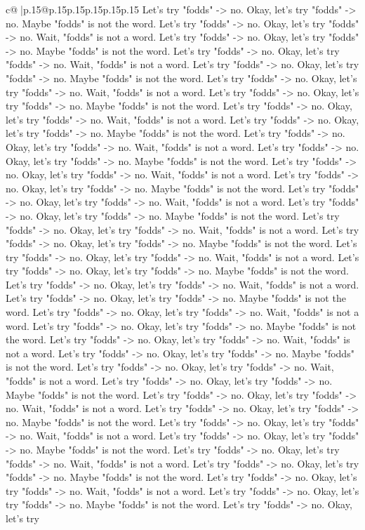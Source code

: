 \documentclass{article}
\begin{document}
{\begin{supertabular}{c@{$\;$}|p{.15\linewidth}@{}p{.15\linewidth}p{.15\linewidth}p{.15\linewidth}p{.15\linewidth}p{.15\linewidth}}
{{{Let's try "fodds" {-}> no. Okay, let's try "fodds" {-}> no. Maybe "fodds" is not the word. Let's try "fodds" {-}> no. Okay, let's try "fodds" {-}> no. Wait, "fodds" is not a word. Let's try "fodds" {-}> no. Okay, let's try "fodds" {-}> no. Maybe "fodds" is not the word. Let's try "fodds" {-}> no. Okay, let's try "fodds" {-}> no. Wait, "fodds" is not a word. Let's try "fodds" {-}> no. Okay, let's try "fodds" {-}> no. Maybe "fodds" is not the word. Let's try "fodds" {-}> no. Okay, let's try "fodds" {-}> no. Wait, "fodds" is not a word. Let's try "fodds" {-}> no. Okay, let's try "fodds" {-}> no. Maybe "fodds" is not the word. Let's try "fodds" {-}> no. Okay, let's try "fodds" {-}> no. Wait, "fodds" is not a word. Let's try "fodds" {-}> no. Okay, let's try "fodds" {-}> no. Maybe "fodds" is not the word. Let's try "fodds" {-}> no. Okay, let's try "fodds" {-}> no. Wait, "fodds" is not a word. Let's try "fodds" {-}> no. Okay, let's try "fodds" {-}> no. Maybe "fodds" is not the word. Let's try "fodds" {-}> no. Okay, let's try "fodds" {-}> no. Wait, "fodds" is not a word. Let's try "fodds" {-}> no. Okay, let's try "fodds" {-}> no. Maybe "fodds" is not the word. Let's try "fodds" {-}> no. Okay, let's try "fodds" {-}> no. Wait, "fodds" is not a word. Let's try "fodds" {-}> no. Okay, let's try "fodds" {-}> no. Maybe "fodds" is not the word. Let's try "fodds" {-}> no. Okay, let's try "fodds" {-}> no. Wait, "fodds" is not a word. Let's try "fodds" {-}> no. Okay, let's try "fodds" {-}> no. Maybe "fodds" is not the word. Let's try "fodds" {-}> no. Okay, let's try "fodds" {-}> no. Wait, "fodds" is not a word. Let's try "fodds" {-}> no. Okay, let's try "fodds" {-}> no. Maybe "fodds" is not the word. Let's try "fodds" {-}> no. Okay, let's try "fodds" {-}> no. Wait, "fodds" is not a word. Let's try "fodds" {-}> no. Okay, let's try "fodds" {-}> no. Maybe "fodds" is not the word. Let's try "fodds" {-}> no. Okay, let's try "fodds" {-}> no. Wait, "fodds" is not a word. Let's try "fodds" {-}> no. Okay, let's try "fodds" {-}> no. Maybe "fodds" is not the word. Let's try "fodds" {-}> no. Okay, let's try "fodds" {-}> no. Wait, "fodds" is not a word. Let's try "fodds" {-}> no. Okay, let's try "fodds" {-}> no. Maybe "fodds" is not the word. Let's try "fodds" {-}> no. Okay, let's try "fodds" {-}> no. Wait, "fodds" is not a word. Let's try "fodds" {-}> no. Okay, let's try "fodds" {-}> no. Maybe "fodds" is not the word. Let's try "fodds" {-}> no. Okay, let's try "fodds" {-}> no. Wait, "fodds" is not a word. Let's try "fodds" {-}> no. Okay, let's try "fodds" {-}> no. Maybe "fodds" is not the word. Let's try "fodds" {-}> no. Okay, let's try "fodds" {-}> no. Wait, "fodds" is not a word. Let's try "fodds" {-}> no. Okay, let's try "fodds" {-}> no. Maybe "fodds" is not the word. Let's try "fodds" {-}> no. Okay, let's try "fodds" {-}> no. Wait, "fodds" is not a word. Let's try "fodds" {-}> no. Okay, let's try "fodds" {-}> no. Maybe "fodds" is not the word. Let's try "fodds" {-}> no. Okay, let's try "fodds" {-}> no. Wait, "fodds" is not a word. Let's try "fodds" {-}> no. Okay, let's try "fodds" {-}> no. Maybe "fodds" is not the word. Let's try "fodds" {-}> no. Okay, let's try }}}
\end{supertabular}}
\end{document}
